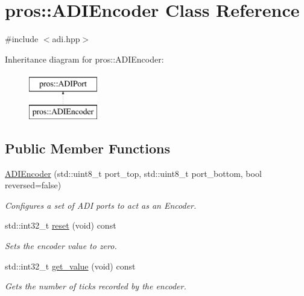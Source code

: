 \hypertarget{classpros_1_1ADIEncoder}{}\section{pros\+::A\+D\+I\+Encoder Class Reference}
\label{classpros_1_1ADIEncoder}


{\ttfamily \#include $<$adi.\+hpp$>$}

Inheritance diagram for pros\+::A\+D\+I\+Encoder\+:\begin{figure}[H]
\begin{center}
\leavevmode
\includegraphics[height=2.000000cm]{classpros_1_1ADIEncoder}
\end{center}
\end{figure}
\subsection*{Public Member Functions}
\begin{DoxyCompactItemize}
\item 
\mbox{\hyperlink{classpros_1_1ADIEncoder_a927287940aedad3ea67f292908c623f7}{A\+D\+I\+Encoder}} (std\+::uint8\+\_\+t port\+\_\+top, std\+::uint8\+\_\+t port\+\_\+bottom, bool reversed=false)
\begin{DoxyCompactList}\small\item\em Configures a set of A\+DI ports to act as an Encoder. \end{DoxyCompactList}\item 
std\+::int32\+\_\+t \mbox{\hyperlink{classpros_1_1ADIEncoder_a38a555946a841150b203f940b4b44cc8}{reset}} (void) const
\begin{DoxyCompactList}\small\item\em Sets the encoder value to zero. \end{DoxyCompactList}\item 
std\+::int32\+\_\+t \mbox{\hyperlink{classpros_1_1ADIEncoder_acb4c087c7318028db25ae39dabb64700}{get\+\_\+value}} (void) const
\begin{DoxyCompactList}\small\item\em Gets the number of ticks recorded by the encoder. \end{DoxyCompactList}\end{DoxyCompactItemize}


